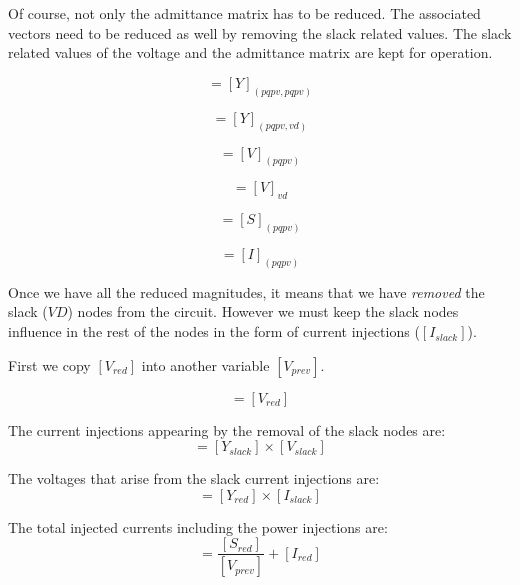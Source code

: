 \documentclass[nols,a4paper,twoside,symmetric,notoc,fleqn]{tufte-book}
\begin{document}
Of course, not only the admittance matrix has to be reduced. The associated vectors need to be reduced as well by removing the slack related values. The slack related values of the voltage and the admittance matrix are kept for operation. 

\begin{equation}
[Y_{red}] = [Y]_{(pqpv, pqpv)}
\end{equation}

\begin{equation}
[Y_{slack}] = [Y]_{(pqpv, vd)}
\end{equation}

\begin{equation}
[V_{red}] = [V]_{(pqpv)}
\end{equation}

\begin{equation}
[V_{slack}] = [V]_{vd}
\end{equation}

\begin{equation}
[S_{red}] = [S]_{(pqpv)}
\end{equation}

\begin{equation}
[I_{red}] = [I]_{(pqpv)}
\end{equation}

Once we have all the reduced magnitudes, it means that we have \textit{removed} the slack ($VD$) nodes from the circuit. However we must keep the slack nodes influence in the rest of the nodes in the form of current injections ($[I_{slack}]$).

First we copy $[V_{red}]$ into another variable $[V_{prev}]$.

\begin{equation}
[V_{prev}] = [V_{red}]
\end{equation}

The current injections appearing by the removal of the slack nodes are:
\begin{equation}
[I_{slack}] = [Y_{slack}] \times [V_{slack}]
\end{equation}

The voltages that arise from the slack current injections are:
\begin{equation}
[C_k] = [Y_{red}] \times [I_{slack}]
\end{equation}

The total injected currents including the power injections are:
\begin{equation}
[I_k] = \frac{[S_{red}]}{[V_{prev}]} + [I_{red}]
\label{eq:zm_ik}
\end{equation}
\end{document}
